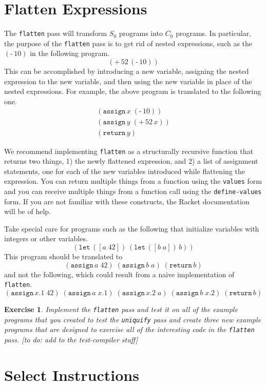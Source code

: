 \documentclass[12pt]{book}
\newtheorem{exercise}[theorem]{Exercise}
\newcommand{\itm}[1]{\ensuremath{\mathit{#1}}}
\newcommand{\key}[1]{\texttt{#1}}
\newcommand{\UNIOP}[2]{(\key{#1}\,#2)}
\newcommand{\BINOP}[3]{(\key{#1}\,#2\,#3)}
\newcommand{\LET}[3]{(\key{let}\,([#1\;#2])\,#3)}
\newcommand{\ASSIGN}[2]{(\key{assign}\,#1\;#2)}
\newcommand{\RETURN}[1]{(\key{return}\,#1)}
\begin{document}
\section{Flatten Expressions}
\label{sec:flatten-s0}

The \key{flatten} pass will transform $S_0$ programs into $C_0$
programs. In particular, the purpose of the \key{flatten} pass is to
get rid of nested expressions, such as the $\UNIOP{-}{10}$ in the
following program.
\[
\BINOP{+}{52}{ \UNIOP{-}{10} }
\]
This can be accomplished by introducing a new variable, assigning the
nested expression to the new variable, and then using the new variable
in place of the nested expressions. For example, the above program is
translated to the following one.
\[
\begin{array}{l}
\ASSIGN{ \itm{x} }{ \UNIOP{-}{10} } \\
\ASSIGN{ \itm{y} }{ \BINOP{+}{52}{ \itm{x} } } \\
\RETURN{ y }
\end{array}
\]

We recommend implementing \key{flatten} as a structurally recursive
function that returns two things, 1) the newly flattened expression,
and 2) a list of assignment statements, one for each of the new
variables introduced while flattening the expression. You can return
multiple things from a function using the \key{values} form and you
can receive multiple things from a function call using the
\key{define-values} form. If you are not familiar with these
constructs, the Racket documentation will be of help.

Take special care for programs such as the following that initialize
variables with integers or other variables.
\[
\LET{a}{42}{ \LET{b}{a}{ b }}
\]
This program should be translated to 
\[
\ASSIGN{a}{42} \;
\ASSIGN{b}{a} \;
\RETURN{b}
\]
and not the following, which could result from a naive implementation
of \key{flatten}.
\[
\ASSIGN{x.1}{42}\;
\ASSIGN{a}{x.1}\;
\ASSIGN{x.2}{a}\;
\ASSIGN{b}{x.2}\;
\RETURN{b}
\]

\begin{exercise}
Implement the \key{flatten} pass and test it on all of the example
programs that you created to test the \key{uniquify} pass and create
three new example programs that are designed to exercise all of the
interesting code in the \key{flatten} pass. 
[to do: add to the test-compiler stuff]
\end{exercise}


\section{Select Instructions}
\label{sec:select-s0}
\end{document}
